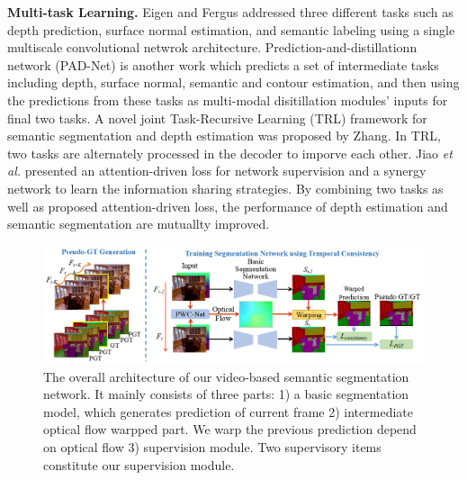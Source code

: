 {\bf Multi-task Learning.} 
%
Eigen and Fergus \cite{Eigen2015} addressed three different tasks such as depth prediction, surface normal estimation, and semantic labeling using a single multiscale convolutional netwrok architecture. 
%
Prediction-and-distillationn network (PAD-Net) is another work\cite{Xu2018} which predicts a set of intermediate tasks including depth, surface normal, semantic and contour estimation, and then using the predictions from these tasks as multi-modal disitillation modules' inputs for final two tasks.  
%
A novel joint Task-Recursive Learning (TRL) \cite{Zhang2018} framework for semantic segmentation and depth estimation was proposed by Zhang. 
%
In TRL, two tasks are alternately processed in the decoder to imporve each other.
% 
Jiao \emph{et al.} \cite{Jiao2018} presented an attention-driven loss for network supervision and a synergy network to learn the information sharing strategies. 
%
By combining two tasks as well as proposed attention-driven loss, the performance of depth estimation and semantic segmentation are mutuallty improved.

\begin{figure}[htbp]
	\centering
	\includegraphics[scale=0.6]{figure/Pipeline.png}
	\caption{The overall architecture of our video-based semantic segmentation network. It mainly consists of three parts: 1) a basic segmentation model, which generates prediction of current frame 2) intermediate optical flow warpped part. We warp the previous prediction depend on optical flow 3) supervision module. Two supervisory items constitute our supervision module.}
	\label{fig:Pipeline}
\end{figure}

